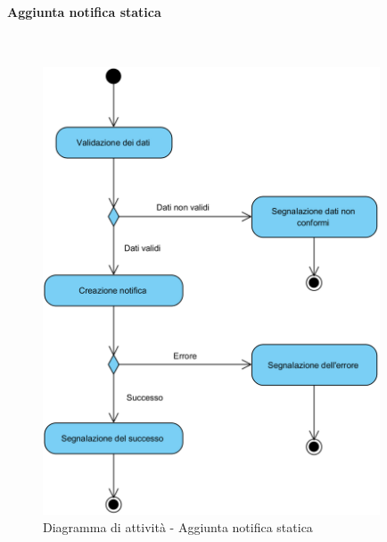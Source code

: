 \paragraph{Aggiunta notifica statica}\mbox{}\\
\nopagebreak
\begin{figure}[H]
	\centering
	\includegraphics[width=10cm]{../../documenti/SpecificaTecnica/diagrammi_img/attivita/addstaticnotification.png}
	\caption{Diagramma di attività - Aggiunta notifica statica}
\end{figure}

